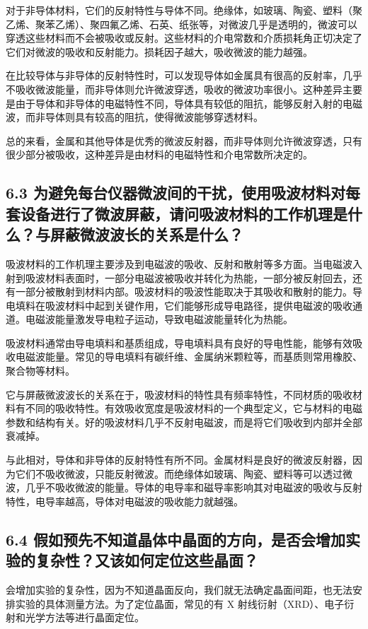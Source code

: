 \documentclass[UTF8]{article}
\theoremstyle{MyLineTheoremStyle} %
\theoremstyle{MyBlockTheoremStyle} %
\theoremstyle{MySubsubsectionStyle} %
\begin{document}
对于非导体材料，它们的反射特性与导体不同。绝缘体，如玻璃、陶瓷、塑料（聚乙烯、聚苯乙烯）、聚四氟乙烯、石英、纸张等，对微波几乎是透明的，微波可以穿透这些材料而不会被吸收或反射。这些材料的介电常数和介质损耗角正切决定了它们对微波的吸收和反射能力。损耗因子越大，吸收微波的能力越强。

在比较导体与非导体的反射特性时，可以发现导体如金属具有很高的反射率，几乎不吸收微波能量，而非导体则允许微波穿透，吸收的微波功率很小。这种差异主要是由于导体和非导体的电磁特性不同，导体具有较低的阻抗，能够反射入射的电磁波，而非导体则具有较高的阻抗，使得微波能够穿透材料。

总的来看，金属和其他导体是优秀的微波反射器，而非导体则允许微波穿透，只有很少部分被吸收，这种差异是由材料的电磁特性和介电常数所决定的。



\subsection*{6.3 为避免每台仪器微波间的干扰，使用吸波材料对每套设备进行了微波屏蔽，请问吸波材料的工作机理是什么？与屏蔽微波波长的关系是什么？}
吸波材料的工作机理主要涉及到电磁波的吸收、反射和散射等多方面。当电磁波入射到吸波材料表面时，一部分电磁波被吸收并转化为热能，一部分被反射回去，还有一部分被散射到材料内部。吸波材料的吸波性能取决于其吸收和散射的能力。导电填料在吸波材料中起到关键作用，它们能够形成导电路径，提供电磁波的吸收通道。电磁波能量激发导电粒子运动，导致电磁波能量转化为热能。

吸波材料通常由导电填料和基质组成，导电填料具有良好的导电性能，能够有效吸收电磁波能量。常见的导电填料有碳纤维、金属纳米颗粒等，而基质则常用橡胶、聚合物等材料。

它与屏蔽微波波长的关系在于，吸波材料的特性具有频率特性，不同材质的吸收材料有不同的吸收特性。有效吸收宽度是吸波材料的一个典型定义，它与材料的电磁参数和结构有关。好的吸波材料几乎不反射电磁波，而是将它们吸收到内部并全部衰减掉。

与此相对，导体和非导体的反射特性有所不同。金属材料是良好的微波反射器，因为它们不吸收微波，只能反射微波。而绝缘体如玻璃、陶瓷、塑料等可以透过微波，几乎不吸收微波的能量。导体的电导率和磁导率影响其对电磁波的吸收与反射特性，电导率越高，导体对电磁波的吸收能力就越强。


\subsection*{6.4 假如预先不知道晶体中晶面的方向，是否会增加实验的复杂性？又该如何定位这些晶面？}
会增加实验的复杂性，因为不知道晶面反向，我们就无法确定晶面间距，也无法安排实验的具体测量方法。为了定位晶面，常见的有 X 射线衍射（XRD）、电子衍射和光学方法等进行晶面定位。
\end{document}
